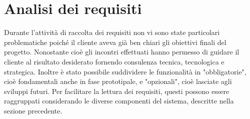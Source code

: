 
\section{Analisi dei requisiti}



Durante l'attività di raccolta dei requisiti non vi sono state particolari problematiche poiché il cliente aveva già ben chiari gli obiettivi finali del progetto. Nonostante cioè gli incontri effettuati hanno permesso di guidare il cliente al risultato desiderato fornendo consulenza tecnica, tecnologica e strategica. Inoltre è stato possibile suddividere le funzionalità in "obbligatorie", cioè fondamentali anche in fase prototipale, e "opzionali", cioè lasciate agli sviluppi futuri.
%
Per facilitare la lettura dei requisiti, questi possono essere raggruppati considerando le diverse componenti del sistema, descritte nella sezione precedente.

